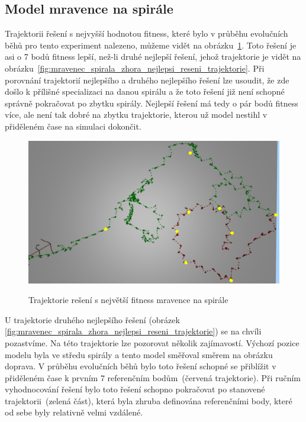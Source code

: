 \clearpage


\subsection{Model mravence na spirále}
Trajektorii řešení s nejvyšší hodnotou fitness, které bylo v průběhu evolučních běhů pro tento experiment nalezeno, můžeme vidět na obrázku~\ref{fig:mravenec_spirala_zhora_nejlepsi_reseni_neoptimalni_trajektorie}.
Toto řešení je asi o 7 bodů fitness lepší, než-li druhé nejlepší řešení, jehož trajektorie je vidět na obrázku~\ref{fig:mravenec_spirala_zhora_nejlepsi_reseni_trajektorie}.
Při porovnání trajektorií nejlepšího a druhého nejlepšího řešení lze usoudit, že zde došlo k přílišné specializaci na danou spirálu a že toto řešení již není schopné správně pokračovat po zbytku spirály.
Nejlepší řešení má tedy o pár bodů fitness více, ale není tak dobré na zbytku trajektorie, kterou už model nestihl v přiděleném čase na simulaci dokončit.

\begin{figure}[h]
    \centering
    {\includegraphics[width=\linewidth]{obrazky/mravenec_spirala_zhora_nejlepsi_reseni_neoptimalni_trajektorie.png}}
    \caption{
    Trajektorie rešení s největší fitness mravence na spirále
    }
    \label{fig:mravenec_spirala_zhora_nejlepsi_reseni_neoptimalni_trajektorie}
\end{figure}

U trajektorie druhého nejlepšího řešení (obrázek \ref{fig:mravenec_spirala_zhora_nejlepsi_reseni_trajektorie}) se na chvíli pozastvíme.
Na této trajektorie lze pozorovat několik zajímavostí.
Výchozí pozice modelu byla ve středu spirály a tento model směřoval směrem na obrázku doprava.
V průběhu evolučních běhů bylo toto řešení schopné se přiblížit v přiděleném čase k prvním 7 referenčním bodům~(červená trajektorie).
Při ručním vyhodnocování řešení bylo toto řešení schopno pokračovat po stanovené trajektorii~(zelená část), která byla zhruba definována referenčními body, které od sebe byly relativně velmi vzdálené.

